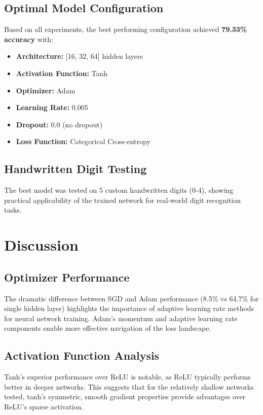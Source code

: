 \documentclass[11pt,a4paper]{article}
\begin{document}
\subsection{Optimal Model Configuration}
Based on all experiments, the best performing configuration achieved \textbf{79.33\% accuracy} with:
\begin{itemize}
    \item \textbf{Architecture:} [16, 32, 64] hidden layers
    \item \textbf{Activation Function:} Tanh
    \item \textbf{Optimizer:} Adam
    \item \textbf{Learning Rate:} 0.005
    \item \textbf{Dropout:} 0.0 (no dropout)
    \item \textbf{Loss Function:} Categorical Cross-entropy
\end{itemize}

\subsection{Handwritten Digit Testing}
The best model was tested on 5 custom handwritten digits (0-4), showing practical applicability of the trained network for real-world digit recognition tasks.

\section{Discussion}

\subsection{Optimizer Performance}
The dramatic difference between SGD and Adam performance (8.5\% vs 64.7\% for single hidden layer) highlights the importance of adaptive learning rate methods for neural network training. Adam's momentum and adaptive learning rate components enable more effective navigation of the loss landscape.

\subsection{Activation Function Analysis}
Tanh's superior performance over ReLU is notable, as ReLU typically performs better in deeper networks. This suggests that for the relatively shallow networks tested, tanh's symmetric, smooth gradient properties provide advantages over ReLU's sparse activation.
\end{document}
